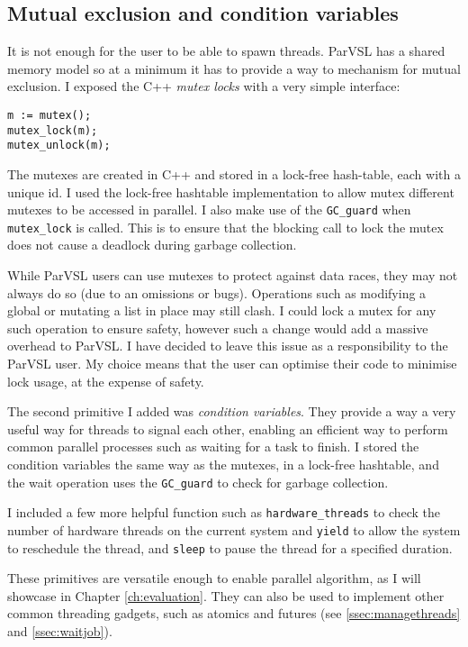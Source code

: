 \subsection{Mutual exclusion and condition variables}

It is not enough for the user to be able to spawn threads. ParVSL has a shared memory model so at a minimum
it has to provide a way to mechanism for mutual exclusion. I exposed the C++ \emph{mutex locks}
with a very simple interface:

\begin{verbatim}
m := mutex();
mutex_lock(m);
mutex_unlock(m);
\end{verbatim}

The mutexes are created in C++ and stored in a lock-free hash-table, each with a unique id. I used the lock-free
hashtable implementation to allow mutex different mutexes to be accessed in parallel. I also
make use of the \verb|GC_guard| when \verb|mutex_lock| is called. This is to ensure that the blocking
call to lock the mutex does not cause a deadlock during garbage collection.

While ParVSL users can use mutexes to protect against data races, they may not always do so
(due to an omissions or bugs). Operations such as modifying a global or mutating a list in place
may still clash.
I could lock a mutex for any such operation to ensure safety, however such a change would add a massive overhead to ParVSL.
I have decided to leave this issue as a responsibility to the ParVSL user.
My choice means that the user can optimise their code to minimise lock usage, at the expense of safety.

The second primitive I added was \emph{condition variables}. They provide a way a very useful way for
threads to signal each other, enabling an efficient way to perform common parallel processes such as
waiting for a task to finish. I stored the condition variables the same way as the mutexes, in a lock-free
hashtable, and the wait operation uses the \verb|GC_guard| to check for garbage collection.

I included a few more helpful function such as \verb|hardware_threads| to check the number of hardware
threads on the current system and \verb|yield| to allow the system to reschedule the thread, and
\verb|sleep| to pause the thread for a specified duration.

These primitives are versatile enough to enable parallel algorithm, as I will showcase in Chapter \ref{ch:evaluation}.
They can also be used to implement other common threading gadgets, such as atomics and futures
(see \ref{ssec:managethreads} and \ref{ssec:waitjob}).

